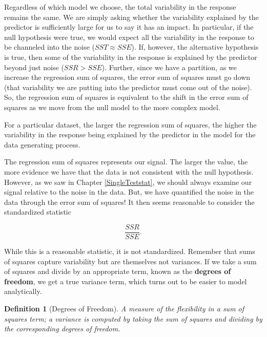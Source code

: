 \documentclass[
]{book}
\theoremstyle{plain}
\theoremstyle{mydefn}
\newtheorem{definition}{Definition}[chapter]
\theoremstyle{myexmpl}
\theoremstyle{remark}
\begin{document}
Regardless of which model we choose, the total variability in the response remains the same. We are simply asking whether the variability explained by the predictor is sufficiently large for us to say it has an impact. In particular, if the null hypothesis were true, we would expect all the variability in the response to be channeled into the noise (\(SST \approx SSE\)). If, however, the alternative hypothesis is true, then some of the variability in the response is explained by the predictor beyond just noise (\(SSR > SSE\)). Further, since we have a partition, as we increase the regression sum of squares, the error sum of squares must go down (that variability we are putting into the predictor must come out of the noise). So, the regression sum of squares is equivalent to the shift in the error sum of squares as we move from the null model to the more complex model.

\begin{rmdkeyidea}
For a particular dataset, the larger the regression sum of squares, the higher the variability in the response being explained by the predictor in the model for the data generating process.\\
\end{rmdkeyidea}

The regression sum of squares represents our signal. The larger the value, the more evidence we have that the data is not consistent with the null hypothesis. However, as we saw in Chapter \ref{SingleTeststat}, we should always examine our signal relative to the noise in the data. But, we have quantified the noise in the data through the error sum of squares! It then seems reasonable to consider the standardized statistic

\[\frac{SSR}{SSE}.\]

While this is a reasonable statistic, it is not standardized. Remember that sums of squares capture variability but are themselves not variances. If we take a sum of squares and divide by an appropriate term, known as the \textbf{degrees of freedom}, we get a true variance term, which turns out to be easier to model analytically.

\begin{definition}[Degrees of Freedom]
\protect\hypertarget{def:defn-df}{}{\label{def:defn-df} {} }A measure of the flexibility in a sum of squares term; a variance is computed by taking the sum of squares and dividing by the corresponding degrees of freedom.
\end{definition}
\end{document}
